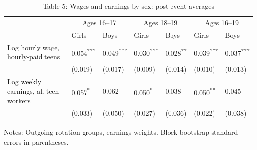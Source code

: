 \documentclass[12pt]{article}
\begin{document}
\begin{table}
\centering
\caption{Table 5: Wages and earnings by sex: post-event averages}

\small
\begin{tabular}{p{}p{}p{}p{}p{}p{}p{}}
\toprule
 & \multicolumn{2}{c}{Ages 16--17} & \multicolumn{2}{c}{Ages 18--19} & \multicolumn{2}{c}{Ages 16--19} \\

 & Girls & Boys & Girls & Boys & Girls & Boys \\
\midrule
Log hourly wage, hourly-paid teens & 0.054\textsuperscript{***} & 0.049\textsuperscript{***} & 0.030\textsuperscript{***} & 0.028\textsuperscript{**} & 0.039\textsuperscript{***} & 0.037\textsuperscript{***} \\
 & (0.019) & (0.017) & (0.009) & (0.014) & (0.010) & (0.013) \\
Log weekly earnings, all teen workers & 0.057\textsuperscript{*} & 0.062 & 0.050\textsuperscript{*} & 0.038 & 0.050\textsuperscript{**} & 0.045 \\
 & (0.033) & (0.050) & (0.027) & (0.036) & (0.022) & (0.038) \\
\bottomrule
\end{tabular}



\noindent\small Notes: Outgoing rotation groups, earnings weights. Block-bootstrap standard errors in parentheses.

\end{table}
\end{document}
